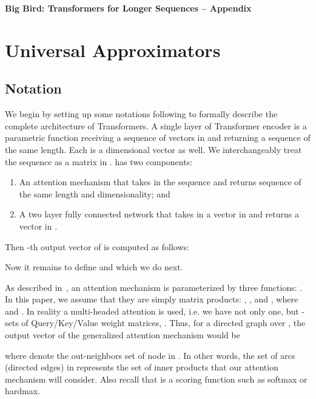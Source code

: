 \documentclass{article}
\begin{document}
\newpage
\appendix
\clearpage{}\begin{center}{
\Large
\textbf{Big Bird: Transformers for Longer Sequences -- Appendix}
}
\end{center}

\newcommand{\Gdpos}{\ensuremath{\mathbf{G}^{E}_{\delta}}}
\newcommand{\FCDpos}{\ensuremath{\mathcal{F}^{E}_{CD}}}
\newcommand{\tx}{\ensuremath{\tilde{x}}}
\newcommand{\tl}{\ensuremath{\tilde{f}}}

\section{Universal Approximators} \label{sec:apndx-universal}

\subsection{Notation}
\label{sec:apndx-enc-notation}
We begin by setting up some notations following \citet{Perez19} to formally describe the complete architecture of Transformers. 
A single layer of Transformer encoder is a parametric function  receiving a sequence  of vectors in  and returning a sequence  of the same length.
Each  is a  dimensional vector as well.
We interchangeably treat the sequence  as a matrix in .
 has two components: 
\begin{enumerate}[leftmargin=6mm, itemsep=2mm, partopsep=0pt,parsep=0pt]
    \item An attention mechanism  that takes in the sequence  and returns sequence  of the same length and dimensionality; and 
    \item A two layer fully connected network  that takes in a vector in  and returns a vector in . 
\end{enumerate}
Then -th output vector of  is computed as follows:

Now it remains to define  and  which we do next.

As described in~, an attention mechanism is parameterized by three functions: . 
In this paper, we assume that they are simply matrix products: , 
, and , where  and 
.
In reality a multi-headed attention is used, i.e. we have not only one,
but -sets of Query/Key/Value weight matrices, .
Thus, for a directed graph  over , the  output vector of the generalized attention mechanism would be

where  denote the out-neighbors set of node  in .
In other words, the set of arcs (directed edges) in  represents the set of inner products that our attention mechanism will consider.
Also recall that  is a scoring function such as softmax or hardmax. 
\end{document}
